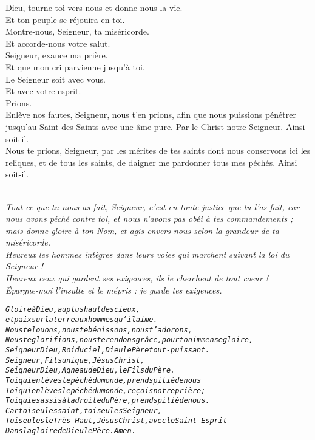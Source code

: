 \documentclass[twoside]{article}
\begin{document}
\begin{paracol}{2}
\switchcolumn

\vv Dieu, tourne-toi vers nous et donne-nous la vie.\\
\rr Et ton peuple se réjouira en toi.\\
\vv Montre-nous, Seigneur, ta miséricorde.\\
\rr Et accorde-nous votre salut.\\
\vv Seigneur, exauce ma prière.\\
\rr Et que mon cri parvienne jusqu’à toi.\\
\vv Le Seigneur soit avec vous.\\
\rr Et avec votre esprit.\\
\vv Prions. \\
Enlève nos fautes, Seigneur, nous t'en prions, aﬁn que nous puissions pénétrer jusqu’au Saint des Saints avec une âme pure. Par le Christ notre Seigneur. Ainsi soit-il.\\
Nous te prions, Seigneur, par les mérites de tes saints dont nous conservons ici les reliques, et de tous les saints, de daigner me pardonner tous mes péchés. Ainsi soit-il.

\end{paracol}


\\
\emph{\rr Tout ce que tu nous as fait, Seigneur, c'est en toute justice que tu l'as fait, car nous avons péché contre toi, et nous n'avons pas obéi à tes commandements ; mais donne gloire à ton Nom, et agis envers nous selon la grandeur de ta miséricorde.\\
\vv {} Heureux les hommes intègres dans leurs voies qui marchent suivant la loi du Seigneur !\\
\vv {} Heureux ceux qui gardent ses exigences, ils le cherchent de tout coeur !\\
\vv {} Épargne-moi l'insulte et le mépris : je garde tes exigences.}



\begin{alltt}\normalfont
\emph{Gloire à Dieu, au plus haut des cieux, 
et paix sur la terre aux hommes qu’il aime.
Nous te louons, nous te bénissons, nous t’adorons,
Nous te glorifions, nous te rendons grâce, pour ton immense gloire,
Seigneur Dieu, Roi du ciel, Dieu le Père tout-puissant.
Seigneur, Fils unique, Jésus Christ,
Seigneur Dieu, Agneau de Dieu, le Fils du Père.
Toi qui enlèves le péché du monde, prends pitié de nous
Toi qui enlèves le péché du monde, reçois notre prière ;
Toi qui es assis à la droite du Père, prends pitié de nous.
Car toi seul es saint, toi seul es Seigneur,
Toi seul es le Très-Haut, Jésus Christ, avec le Saint-Esprit
Dans la gloire de Dieu le Père. Amen.}
\end{alltt}
\end{document}
